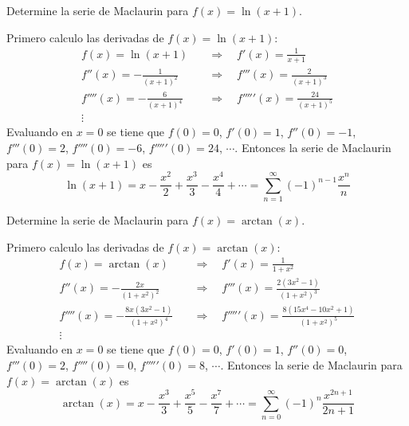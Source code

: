 \documentclass{article}
\begin{document}
\begin{example}{4}
    Determine la serie de Maclaurin para $f(x) = \ln(x+1)$.
\end{example}
Primero calculo las derivadas de $f(x) = \ln(x+1)$:
\begin{align*}
    f(x) = \ln(x+1) \quad &\Rightarrow \quad f'(x) = \frac{1}{x+1} \\
    f''(x) = -\frac{1}{(x+1)^2} \quad &\Rightarrow \quad f'''(x) = \frac{2}{(x+1)^3} \\
    f''''(x) = -\frac{6}{(x+1)^4} \quad &\Rightarrow \quad f'''''(x) = \frac{24}{(x+1)^5} \\
    \vdots
\end{align*}
Evaluando en $x=0$ se tiene que $f(0) = 0$, $f'(0) = 1$, $f''(0) = -1$, $f'''(0) = 2$, $f''''(0) = -6$, $f'''''(0) = 24$, $\cdots$. Entonces la serie de Maclaurin para $f(x) = \ln(x+1)$ es
\begin{equation*}
    \ln(x+1) = x - \frac{x^2}{2} + \frac{x^3}{3} - \frac{x^4}{4} + \cdots = \sum_{n=1}^{\infty} (-1)^{n-1} \frac{x^n}{n}
\end{equation*}

\newpage
\begin{example}{5}
    Determine la serie de Maclaurin para $f(x) = \arctan(x)$.
\end{example}
Primero calculo las derivadas de $f(x) = \arctan(x)$:
\begin{align*}
    f(x) = \arctan(x) \quad &\Rightarrow \quad f'(x) = \frac{1}{1+x^2} \\
    f''(x) = -\frac{2x}{(1+x^2)^2} \quad &\Rightarrow \quad f'''(x) = \frac{2(3x^2-1)}{(1+x^2)^3} \\
    f''''(x) = -\frac{8x(3x^2-1)}{(1+x^2)^4} \quad &\Rightarrow \quad f'''''(x) = \frac{8(15x^4-10x^2+1)}{(1+x^2)^5} \\
    \vdots
\end{align*}
Evaluando en $x=0$ se tiene que $f(0) = 0$, $f'(0) = 1$, $f''(0) = 0$, $f'''(0) = 2$, $f''''(0) = 0$, $f'''''(0) = 8$, $\cdots$. Entonces la serie de Maclaurin para $f(x) = \arctan(x)$ es
\begin{equation*}
    \arctan(x) = x - \frac{x^3}{3} + \frac{x^5}{5} - \frac{x^7}{7} + \cdots = \sum_{n=0}^{\infty} (-1)^n \frac{x^{2n+1}}{2n+1}
\end{equation*}
\end{document}
